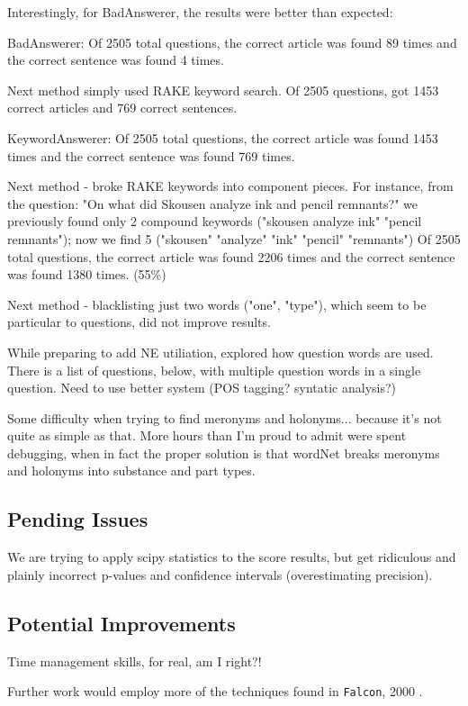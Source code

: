 \documentclass[11pt]{article}
\begin{document}
Interestingly, for BadAnswerer, the results were better than expected:

BadAnswerer: Of 2505 total questions, the correct article was found 89 times and the correct sentence was found 4 times.

Next method simply used RAKE keyword search. Of 2505 questions, got 1453 correct articles and 769 correct sentences.

KeywordAnswerer: Of 2505 total questions, the correct article was found 1453 times and the correct sentence was found 769 times.

Next method - broke RAKE keywords into component pieces. For instance, from the question: "On what did Skousen analyze ink and pencil remnants?" we previously found only 2 compound keywords ("skousen analyze ink" "pencil remnants"); now we find 5 ("skousen" "analyze" "ink" "pencil" "remnants")
Of 2505 total questions, the correct article was found 2206 times and the correct sentence was found 1380 times. (55\%)

Next method - blacklisting just two words ("one", "type"), which seem to be particular to questions, did not improve results.

While preparing to add NE utiliation, explored how question words are used. There is a list of questions, below, with multiple question words in a single question. Need to use better system (POS tagging? syntatic analysis?)

Some difficulty when trying to find meronyms and holonyms... because it's not quite as simple as that. More hours than I'm proud to admit were spent debugging, when in fact the proper solution is that wordNet breaks meronyms and holonyms into substance and part types.

\subsection{Pending Issues}

We are trying to apply scipy statistics to the score results, but get ridiculous and plainly incorrect p-values and confidence intervals (overestimating precision).

\subsection{Potential Improvements}

Time management skills, for real, am I right?!

Further work would employ more of the techniques found in \texttt{Falcon}, 2000 \cite{falcon2000}.

{}

\end{document}
